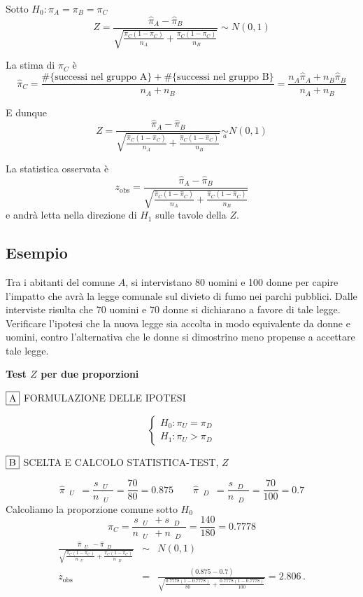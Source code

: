 \documentclass[
  11pt,
]{book}
\theoremstyle{mytheoremstyle}
\theoremstyle{mydefstyle}
\begin{document}
Sotto \(H_0:\pi_A=\pi_B=\pi_C\)
\[Z=\frac{\hat\pi_A - \hat\pi_B}{\sqrt{\frac{\pi_C(1-\pi_C)}{n_A}+\frac{\pi_C(1-\pi_C)}{n_B}}}\sim N(0,1)\]

La stima di \(\pi_C\) è
\[\hat\pi_C=\frac{\#\{\text{successi nel gruppo A}\}+\#\{\text{successi nel gruppo B}\}}{n_A+n_B}=\frac{n_A\hat\pi_A+n_B\hat\pi_B}{n_A+n_B}\]

E dunque
\[Z=\frac{\hat\pi_A - \hat\pi_B}{\sqrt{\frac{\hat\pi_C(1-\hat\pi_C)}{n_A}+\frac{\hat\pi_C(1-\hat\pi_C)}{n_B}}}\operatorname*{\sim}_a N(0,1)\]

La statistica osservata è
\[z_{\text{obs}}=\frac{\hat\pi_A-\hat\pi_B}{\sqrt{\frac{\hat\pi_C(1-\hat\pi_C)}{n_A}+\frac{\hat\pi_C(1-\hat\pi_C)}{n_B}}}\]
e andrà letta nella direzione di \(H_1\) sulle tavole della \(Z\).

\subsection{Esempio}\label{esempio-5}

Tra i abitanti del comune \(A\), si intervistano 80 uomini e 100 donne
per capire l'impatto che avrà la legge comunale sul divieto di
fumo nei parchi pubblici. Dalle interviste risulta che 70
uomini e 70 donne si dichiarano a favore di tale legge.
Verificare l'ipotesi che la nuova legge sia
accolta in modo equivalente da donne e uomini,
contro l'alternativa che le donne si dimostrino meno
propense a accettare tale legge.

\textbf{Test \(Z\) per due proporzioni}

\(\fbox{A}\) FORMULAZIONE DELLE IPOTESI

\[\begin{cases}
   H_0: \pi_\text{$U$} = \pi_\text{$D$} \\
   H_1: \pi_\text{$U$} > \pi_\text{$D$} 
   \end{cases}\]

\(\fbox{B}\) SCELTA E CALCOLO STATISTICA-TEST, \(Z\)

\[\hat\pi_\text{ $U$ }=\frac{s_\text{ $U$ }}{n_\text{ $U$ }}=\frac{ 70 }{ 80 }= 0.875 \qquad
   \hat\pi_\text{ $D$ }=\frac{s_\text{ $D$ }}{n_\text{ $D$ }}=\frac{ 70 }{ 100 }= 0.7 \]Calcoliamo la proporzione comune sotto \(H_0\)
\[
     \pi_C=\frac{s_\text{ $U$ }+s_\text{ $D$ }}{n_\text{ $U$ }+n_\text{ $D$ }}=
     \frac{ 140 }{ 180 }= 0.7778 
   \]\begin{eqnarray*}
   \frac{\hat\pi_\text{ $U$ } - \hat\pi_\text{ $D$ }}
   {\sqrt{\frac {\pi_C(1-\pi_C)}{n_\text{ $U$ }}+\frac {\pi_C(1-\pi_C)}{n_\text{ $D$ }}}}&\sim&N(0,1)\\
   z_{\text{obs}}
   &=& \frac{ ( 0.875 -  0.7 )} {\sqrt{\frac{ 0.7778 (1- 0.7778 )}{ 80 }+\frac{ 0.7778 (1- 0.7778 )}{ 100 }}}
   =   2.806 \, .
   \end{eqnarray*}
\end{document}
